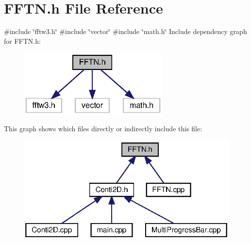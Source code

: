 \section{F\+F\+T\+N.\+h File Reference}
\label{FFTN_8h}
{\ttfamily \#include \char`\"{}fftw3.\+h\char`\"{}}\newline
{\ttfamily \#include \char`\"{}vector\char`\"{}}\newline
{\ttfamily \#include \char`\"{}math.\+h\char`\"{}}\newline
Include dependency graph for F\+F\+T\+N.\+h\+:\nopagebreak
\begin{figure}[H]
\begin{center}
\leavevmode
\includegraphics[width=215pt]{FFTN_8h__incl}
\end{center}
\end{figure}
This graph shows which files directly or indirectly include this file\+:\nopagebreak
\begin{figure}[H]
\begin{center}
\leavevmode
\includegraphics[width=319pt]{FFTN_8h__dep__incl}
\end{center}
\end{figure}

